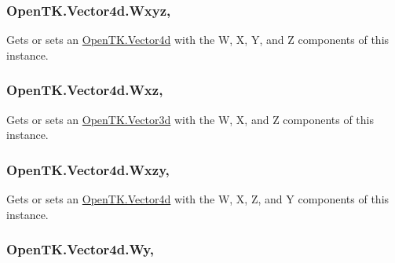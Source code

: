 \hypertarget{struct_open_t_k_1_1_vector4d_aca45279533fcd6f06940311f4162a0b1}{
\subsubsection[{Wxyz}]{ Open\-T\-K.\-Vector4d.\-Wxyz\hspace{0.3cm}{\ttfamily [get]}, {\ttfamily [set]}}}\label{struct_open_t_k_1_1_vector4d_aca45279533fcd6f06940311f4162a0b1}


Gets or sets an \hyperlink{struct_open_t_k_1_1_vector4d}{Open\-T\-K.\-Vector4d} with the W, X, Y, and Z components of this instance. 

\hypertarget{struct_open_t_k_1_1_vector4d_aec7991cece26db42819179ed030e0714}{
\subsubsection[{Wxz}]{ Open\-T\-K.\-Vector4d.\-Wxz\hspace{0.3cm}{\ttfamily [get]}, {\ttfamily [set]}}}\label{struct_open_t_k_1_1_vector4d_aec7991cece26db42819179ed030e0714}


Gets or sets an \hyperlink{struct_open_t_k_1_1_vector3d}{Open\-T\-K.\-Vector3d} with the W, X, and Z components of this instance. 

\hypertarget{struct_open_t_k_1_1_vector4d_aeb143492351bd2ef9d7cb4526a6db7cf}{
\subsubsection[{Wxzy}]{ Open\-T\-K.\-Vector4d.\-Wxzy\hspace{0.3cm}{\ttfamily [get]}, {\ttfamily [set]}}}\label{struct_open_t_k_1_1_vector4d_aeb143492351bd2ef9d7cb4526a6db7cf}


Gets or sets an \hyperlink{struct_open_t_k_1_1_vector4d}{Open\-T\-K.\-Vector4d} with the W, X, Z, and Y components of this instance. 

\hypertarget{struct_open_t_k_1_1_vector4d_a18468220fd0c64160b718b9997708435}{
\subsubsection[{Wy}]{ Open\-T\-K.\-Vector4d.\-Wy\hspace{0.3cm}{\ttfamily [get]}, {\ttfamily [set]}}}\label{struct_open_t_k_1_1_vector4d_a18468220fd0c64160b718b9997708435}


